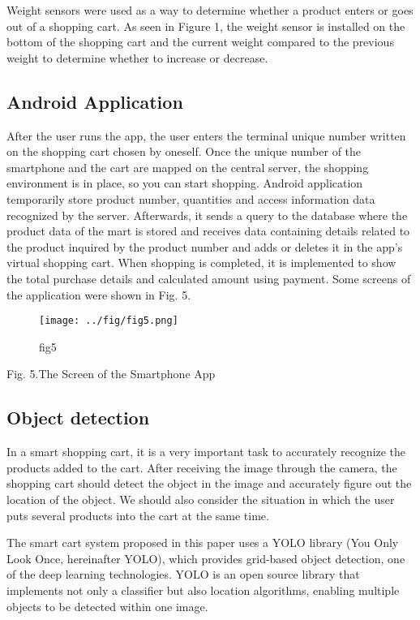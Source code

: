 \documentclass[smallextended]{svjour3}       %
\begin{document}
Weight sensors were used as a way to determine whether a product enters
or goes out of a shopping cart. As seen in Figure 1, the weight sensor
is installed on the bottom of the shopping cart and the current weight
compared to the previous weight to determine whether to increase or
decrease.

\hypertarget{android-application}{%
\subsection{Android Application}\label{android-application}}

After the user runs the app, the user enters the terminal unique number
written on the shopping cart chosen by oneself. Once the unique number
of the smartphone and the cart are mapped on the central server, the
shopping environment is in place, so you can start shopping. Android
application temporarily store product number, quantities and access
information data recognized by the server. Afterwards, it sends a query
to the database where the product data of the mart is stored and
receives data containing details related to the product inquired by the
product number and adds or deletes it in the app's virtual shopping
cart. When shopping is completed, it is implemented to show the total
purchase details and calculated amount using payment. Some screens of
the application were shown in Fig. 5.

\begin{figure}
\centering
\texttt{[image: ../fig/fig5.png]}
\caption{fig5}
\end{figure}

Fig. 5.The Screen of the Smartphone App

\hypertarget{object-detection}{%
\subsection{Object detection}\label{object-detection}}

In a smart shopping cart, it is a very important task to accurately
recognize the products added to the cart. After receiving the image
through the camera, the shopping cart should detect the object in the
image and accurately figure out the location of the object. We should
also consider the situation in which the user puts several products into
the cart at the same time.

The smart cart system proposed in this paper uses a YOLO library (You
Only Look Once, hereinafter YOLO), which provides grid-based object
detection, one of the deep learning technologies. YOLO is an open source
library that implements not only a classifier but also location
algorithms, enabling multiple objects to be detected within one
image\cite{redmon2016you}.
\end{document}
